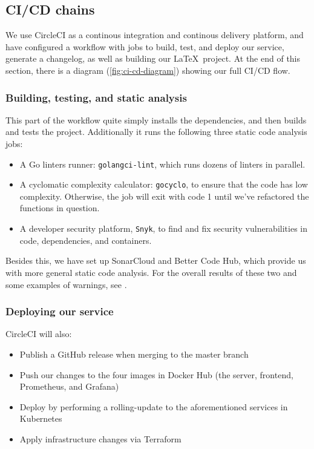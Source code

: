 \subsection{CI/CD chains}
\label{sec:ci-cd-chains}

We use CircleCI as a continous integration and continous delivery platform, and have configured a workflow \cite{workflow:circleci} with jobs to build, test, and deploy our service, generate a changelog, as well as building our \LaTeX\ project. At the end of this section, there is a diagram (\autoref{fig:ci-cd-diagram}) showing our full CI/CD flow.

\subsubsection{Building, testing, and static analysis}

This part of the workflow quite simply installs the dependencies, and then builds and tests the project. Additionally it runs the following three static code analysis jobs:
\begin{itemize}
    \item A Go linters runner: \texttt{golangci-lint}, which runs dozens of linters in parallel.
    \item A cyclomatic complexity calculator: \texttt{gocyclo}, to ensure that the code has low complexity. Otherwise, the job will exit with code 1 until we've refactored the functions in question.
    \item A developer security platform, \texttt{Snyk}, to find and fix security vulnerabilities in code, dependencies, and containers.
\end{itemize}

Besides this, we have set up SonarCloud and Better Code Hub, which provide us with more general static code analysis. For the overall results of these two and some examples of warnings, see .

\subsubsection{Deploying our service}

CircleCI will also:
\begin{itemize}
    \item Publish a GitHub release when merging to the master branch
    \item Push our changes to the four images in Docker Hub (the server, frontend, Prometheus, and Grafana)
    \item Deploy by performing a rolling-update to the aforementioned services in Kubernetes
    \item Apply infrastructure changes via Terraform
\end{itemize}


